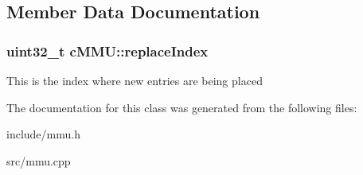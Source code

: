 \subsection{\-Member \-Data \-Documentation}
\hypertarget{classcMMU_a90cbcd50347e8b9030f66bce2fc52e2a}{
\subsubsection[{replace\-Index}]{\setlength{\rightskip}{0pt plus 5cm}uint32\-\_\-t {\bf c\-M\-M\-U\-::replace\-Index}}}\label{df/deb/classcMMU_a90cbcd50347e8b9030f66bce2fc52e2a}
\-This is the index where new entries are being placed 

\-The documentation for this class was generated from the following files\-:\begin{DoxyCompactItemize}
\item 
include/mmu.\-h\item 
src/mmu.\-cpp\end{DoxyCompactItemize}
